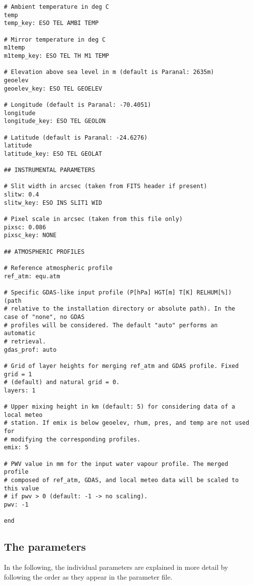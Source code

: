 {\begin{verbatim}
# Ambient temperature in deg C
temp
temp_key: ESO TEL AMBI TEMP

# Mirror temperature in deg C
m1temp
m1temp_key: ESO TEL TH M1 TEMP

# Elevation above sea level in m (default is Paranal: 2635m)
geoelev
geoelev_key: ESO TEL GEOELEV

# Longitude (default is Paranal: -70.4051)
longitude
longitude_key: ESO TEL GEOLON

# Latitude (default is Paranal: -24.6276)
latitude
latitude_key: ESO TEL GEOLAT

## INSTRUMENTAL PARAMETERS

# Slit width in arcsec (taken from FITS header if present)
slitw: 0.4
slitw_key: ESO INS SLIT1 WID

# Pixel scale in arcsec (taken from this file only)
pixsc: 0.086
pixsc_key: NONE

## ATMOSPHERIC PROFILES

# Reference atmospheric profile
ref_atm: equ.atm

# Specific GDAS-like input profile (P[hPa] HGT[m] T[K] RELHUM[%]) (path
# relative to the installation directory or absolute path). In the case of "none", no GDAS
# profiles will be considered. The default "auto" performs an automatic
# retrieval.
gdas_prof: auto

# Grid of layer heights for merging ref_atm and GDAS profile. Fixed grid = 1
# (default) and natural grid = 0.
layers: 1

# Upper mixing height in km (default: 5) for considering data of a local meteo
# station. If emix is below geoelev, rhum, pres, and temp are not used for
# modifying the corresponding profiles.
emix: 5

# PWV value in mm for the input water vapour profile. The merged profile
# composed of ref_atm, GDAS, and local meteo data will be scaled to this value
# if pwv > 0 (default: -1 -> no scaling).
pwv: -1

end
\end{verbatim}
}


\subsection{The parameters}\label{sec:params}
In the following, the individual parameters are explained in more detail by
following the order as they appear in the parameter file.

